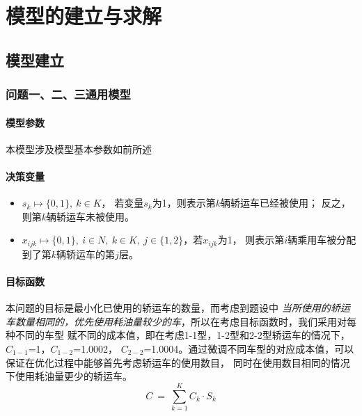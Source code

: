 \documentclass[UTF8]{ctexart}
\begin{document}
\section{模型的建立与求解}
\subsection{模型建立}
\subsubsection{问题一、二、三通用模型}

\paragraph{模型参数}
	本模型涉及模型基本参数如前所述
\paragraph{决策变量}
\begin{itemize}
	\item $s_k \mapsto \{0,1\}, ~ k \in K$， 若变量$s_k$为1，则表示第$k$辆轿运车已经被使用；
	反之，则第$k$辆轿运车未被使用。
	\item $x_{ijk}\mapsto \{0,1\}, ~ i\in N,~ k \in K,~ j\in \{1,2\}$，若$x_{ijk}$为1，
	则表示第$i$辆乘用车被分配到了第$k$辆轿运车的第$j$层。
\end{itemize}

\paragraph{目标函数}
	本问题的目标是最小化已使用的轿运车的数量，而考虑到题设中
	\textit{当所使用的轿运车数量相同的，优先使用耗油量较少的车}，所以在考虑目标函数时，我们采用对每种不同的车型
	赋不同的成本值，即在考虑1-1型，1-2型和2-2型轿运车的情况下，$C_{1-1}$=1，$C_{1-2}$=1.0002，
	$C_{2-2}$=1.0004。通过微调不同车型的对应成本值，可以保证在优化过程中能够首先考虑轿运车的使用数目，
	同时在使用数目相同的情况下使用耗油量更少的轿运车。
	\begin{equation}
		C \ = \ \sum_{k=1}^{K}C_k \cdot S_k
	\end{equation}
\end{document}

